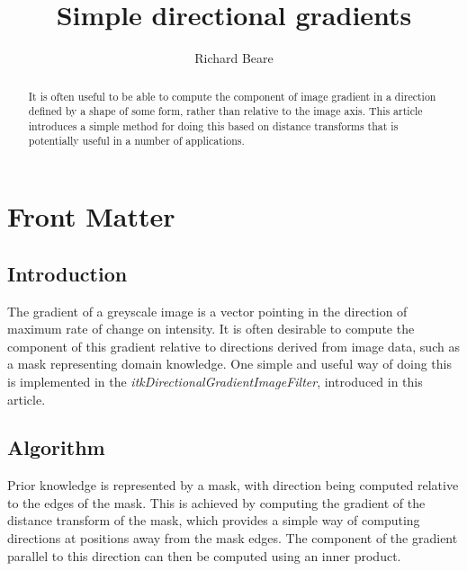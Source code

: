 \documentclass{InsightArticle}
\title{Simple directional gradients}
\author{Richard Beare}
\begin{document}
\maketitle

\ifhtml
\chapter*{Front Matter\label{front}}
\fi


\begin{abstract}
\noindent
It is often useful to be able to compute the component of image
gradient in a direction defined by a shape of some form, rather than
relative to the image axis. This article introduces a simple method
for doing this based on distance transforms that is potentially useful
in a number of applications.
\end{abstract}

\tableofcontents

\section{Introduction}
The gradient of a greyscale image is a vector pointing in the
direction of maximum rate of change on intensity. It is often
desirable to compute the component of this gradient relative to
directions derived from image data, such as a mask representing domain
knowledge. One simple and useful way of doing this is implemented in
the {\em itkDirectionalGradientImageFilter}, introduced in this
article.

\section{Algorithm}
Prior knowledge is represented by a mask, with direction being
computed relative to the edges of the mask. This is achieved by
computing the gradient of the distance transform of the mask, which
provides a simple way of computing directions at positions away from
the mask edges. The component of the gradient parallel to this
direction can then be computed using an inner product.
\end{document}
